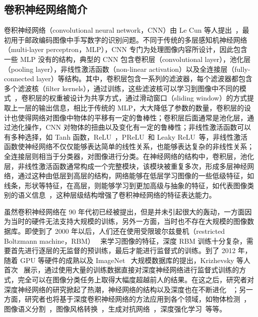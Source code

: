 \subsection{卷积神经网络简介}
卷积神经网络（convolutional neural network，CNN）由 Le Cun 等人提出~\cite{Lecun1990HandwrittenZC,LeCun1998GradientbasedLA}，最初用于邮政编码图像中手写数字的识别问题。不同于传统的多层感知机神经网络（multi-layer perceptron，MLP），CNN 专门为处理图像内容所设计，因此包含一些 MLP 没有的结构，典型的 CNN 包含卷积层（convolutional layer），池化层（pooling layer），非线性激活函数（non-linear activation）以及全连接层（fully-connected layer）等结构。其中，卷积层包含一系列的滤波器，每个滤波器都包含多个滤波核（filter kernels），通过训练，这些滤波核可以学习到图像中不同的模式~\cite{Zeiler2014VisualizingAU,Krizhevsky2012ImageNetCW}，卷积层的权重被设计为共享方式，通过滑动窗口（sliding window）的方式提取上一层的输出信息，相比于传统的 MLP，大大降低了参数的数量，卷积层的设计也使得网络对图像中物体的平移有一定的鲁棒性；卷积层后面通常是池化层，通过池化操作，CNN 对物体的扭曲以及变化有一定的鲁棒性；非线性激活函数可以有多种选择，如 Tanh 函数，ReLU~\cite{Glorot2011DeepSR}，PReLU~\cite{He2015DelvingDI}和 Leaky ReLU~\cite{maas2013rectifier}等，非线性激活函数使神经网络不仅仅能够表达简单的线性关系，也能够表达复杂的非线性关系；全连接层则相当于分类器，对图像进行分类。在神经网络的结构中，卷积层，池化层，非线性激活函数通常构成一个完整模块，该模块被重复多次，形成多层神经网络，通过这种由低层到高层的结构，网络能够在低层学习图像的一些低级特征，如线条，形状等特征，在高层，则能够学习到更加高级与抽象的特征，如代表图像类别的语义信息~\cite{Krizhevsky2012ImageNetCW}，这种层级结构增强了卷积神经网络的特征表达能力。

虽然卷积神经网络在 90 年代初已经被提出，但是并未引起很大的轰动，一方面因为当时的硬件无法支持大规模的训练，另外一方面，当时也不存在大规模的图像数据库。即使到了 2000 年以后，人们还在使用受限玻尔兹曼机（restricted Boltzmann machine，RBM）~\cite{Salakhutdinov2009DeepBM,Salakhutdinov2012AnEL} 来学习图像的特征，深度 RBM 训练十分复杂，需要首先进行逐层的无监督的预训练，最后才能进行监督式的训练。到了 2012 年，随着 GPU 等硬件的成熟以及 ImageNet~\cite{Russakovsky2015ImageNetLS} 大规模数据库的提出，Krizhevsky 等人首次~\cite{Krizhevsky2012ImageNetCW} 展示，通过使用大量的训练数据直接对深度神经网络进行监督式训练的方式，完全可以在图像分类任务上取得大幅度超越前人的结果。在这之后，研究者对深度神经网络的研究掀起了热潮，神经网络的结构以及深度也在不断进化~
\cite{Zeiler2014VisualizingAU,Simonyan2014VeryDC,Szegedy2015GoingDW,He2016DeepRL,Huang2017DenselyCC}；另一方面，研究者也将基于深度卷积神经网络的方法应用到各个领域，如物体检测~\cite{Liu2016SSDSS,Redmon2016YouOL,Lin2017FocalLF,Ren2017FasterRT}，图像语义分割~\cite{Shelhamer2017FullyCN,Chen2018DeepLabSI,Noh2015LearningDN}，图像风格转换~\cite{Gatys2016ImageST,Johnson2016PerceptualLF}，生成对抗网络~\cite{Goodfellow2014GenerativeAN,Mirza2014ConditionalGA}，深度强化学习~\cite{Mnih2015HumanlevelCT,Silver2016MasteringTG}等等。

